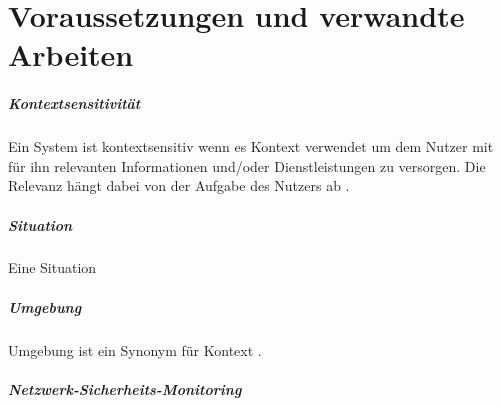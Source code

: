 \chapter{Voraussetzungen und verwandte Arbeiten}
\label{cha:requirements_and_related_work}




\paragraph{Kontextsensitivität}

Ein System ist kontextsensitiv wenn es Kontext verwendet um dem Nutzer mit für ihn relevanten Informationen und/oder Dienstleistungen zu versorgen. Die Relevanz hängt dabei von der Aufgabe des Nutzers ab \cite{dey_understanding_2001}.
\paragraph{Situation}
Eine Situation 
\paragraph{Umgebung}
Umgebung ist ein Synonym für Kontext \cite{abowd_towards_1999}.
\paragraph{Netzwerk-Sicherheits-Monitoring}

